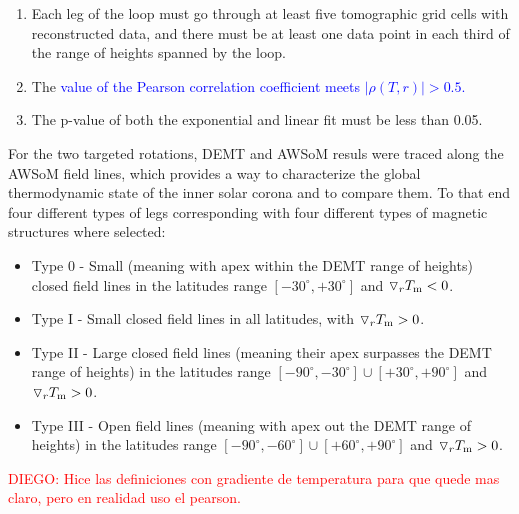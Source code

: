 \documentclass[namedreferences]{solarphysics}
\newcommand{\mdeg}{^\circ}
\newcommand{\dr}{\triangledown_r}
\newcommand{\Tm}{T_{\rm m}}
\newcommand{\rhoTr}{\rho(T,r)}
\def\diego#1{\textcolor{red}{DIEGO: #1}}
\def\albert#1{\textcolor{blue}{#1}}
\def\temp#1{\textcolor{mygray}{#1}}
\begin{document}
\begin{article}
\begin{enumerate}
\item 
Each leg of the loop must go through at least five tomographic grid cells with reconstructed data, and there must be at least one data point in each third of the range of heights spanned by the loop.

\item 
The \albert{value of the Pearson correlation coefficient meets $|\rhoTr| > 0.5$.}

\item 
The p-value of both the exponential and linear fit must be less than 0.05.

\end{enumerate}


For the two targeted rotations, DEMT and AWSoM resuls were traced along the AWSoM field lines, which provides a way to characterize the global thermodynamic state of the inner solar corona and to compare them. To that end four different types of legs corresponding with four different types of magnetic structures where selected:

\begin{itemize}
 \item Type 0 - Small (meaning with apex within the DEMT range of heights) closed field lines in the latitudes range $[-30\mdeg,+30\mdeg]$ and $\dr \Tm < 0$. %

\item  Type I - Small closed field lines in all latitudes, with $\dr \Tm > 0$. %

\item  Type II - Large closed field lines (meaning their apex surpasses the DEMT range of heights) in the latitudes range $[-90\mdeg,-30\mdeg] \cup [+30\mdeg,+90\mdeg]$ and $\dr \Tm > 0$. %

\item Type III - Open field lines (meaning with apex out the DEMT range of heights) in the latitudes range $[-90\mdeg,-60\mdeg] \cup [+60\mdeg,+90\mdeg]$ and $\dr \Tm > 0$.

\end{itemize}
\diego{Hice las definiciones con gradiente de temperatura para que quede mas claro, pero en realidad uso el pearson.} 





\end{article}
\end{document}
